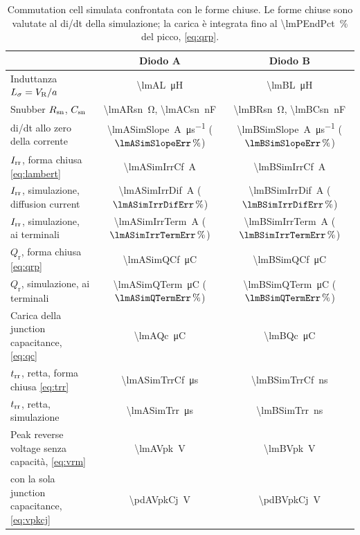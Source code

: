 \documentclass[10pt,a4paper]{scrartcl}
\let\newcommand\pdvaluedefine
\newcommand{\VR}{V_\mathrm{R}}
\newcommand{\Irr}{I_\mathrm{rr}}
\newcommand{\trr}{t_\mathrm{rr}}
\newcommand{\Csn}{C_\mathrm{sn}}
\newcommand{\Rsn}{R_\mathrm{sn}}
\newcommand{\Ls}{L_\sigma}                    %
\begin{document}
\begin{table}[htb]
\centering\small
\caption{Commutation cell simulata confrontata con le forme chiuse. Le forme chiuse sono valutate al di/dt della simulazione; la carica è integrata fino al \SI{\lmPEndPct}{\percent} del picco, \eqref{eq:qrp}.}
\label{tab:cell}
\begin{tabular}{@{}lcc@{}}
\toprule
 & Diodo A & Diodo B \\
\midrule
Induttanza $\Ls = \VR/a$ & \SI{\lmAL}{\micro\henry} & \SI{\lmBL}{\micro\henry} \\
Snubber $\Rsn$, $\Csn$ & \SI{\lmARsn}{\ohm}, \SI{\lmACsn}{\nano\farad} & \SI{\lmBRsn}{\ohm}, \SI{\lmBCsn}{\nano\farad} \\
di/dt allo zero della corrente & \SI{\lmASimSlope}{\ampere\per\micro\second} ($\lmASimSlopeErr\,\%$) & \SI{\lmBSimSlope}{\ampere\per\micro\second} ($\lmBSimSlopeErr\,\%$) \\
\addlinespace
$\Irr$, forma chiusa \eqref{eq:lambert} & \SI{\lmASimIrrCf}{\ampere} & \SI{\lmBSimIrrCf}{\ampere} \\
$\Irr$, simulazione, diffusion current & \SI{\lmASimIrrDif}{\ampere} ($\lmASimIrrDifErr\,\%$) & \SI{\lmBSimIrrDif}{\ampere} ($\lmBSimIrrDifErr\,\%$) \\
$\Irr$, simulazione, ai terminali & \SI{\lmASimIrrTerm}{\ampere} ($\lmASimIrrTermErr\,\%$) & \SI{\lmBSimIrrTerm}{\ampere} ($\lmBSimIrrTermErr\,\%$) \\
\addlinespace
$Q_\mathrm{r}$, forma chiusa \eqref{eq:qrp} & \SI{\lmASimQCf}{\micro\coulomb} & \SI{\lmBSimQCf}{\micro\coulomb} \\
$Q_\mathrm{r}$, simulazione, ai terminali & \SI{\lmASimQTerm}{\micro\coulomb} ($\lmASimQTermErr\,\%$) & \SI{\lmBSimQTerm}{\micro\coulomb} ($\lmBSimQTermErr\,\%$) \\
Carica della junction capacitance, \eqref{eq:qc} & \SI{\lmAQc}{\micro\coulomb} & \SI{\lmBQc}{\micro\coulomb} \\
\addlinespace
$\trr$, retta, forma chiusa \eqref{eq:trr} & \SI{\lmASimTrrCf}{\micro\second} & \SI{\lmBSimTrrCf}{\nano\second} \\
$\trr$, retta, simulazione & \SI{\lmASimTrr}{\micro\second} & \SI{\lmBSimTrr}{\nano\second} \\
\addlinespace
Peak reverse voltage senza capacità, \eqref{eq:vrm} & \SI{\lmAVpk}{\volt} & \SI{\lmBVpk}{\volt} \\
\quad con la sola junction capacitance, \eqref{eq:vpkcj} & \SI{\pdAVpkCj}{\volt} & \SI{\pdBVpkCj}{\volt} \\

\end{tabular}
\end{table}
\end{document}

